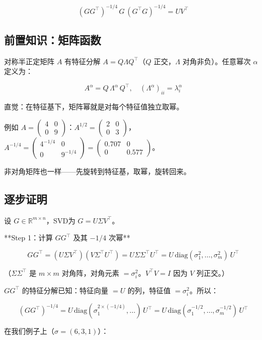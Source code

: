 \documentclass[12pt,a4paper]{article}
\begin{document}
\[(GG^\top)^{-1/4}\,G\,(G^\top G)^{-1/4} = UV^\top\]


\subsection{前置知识：矩阵函数}

对称半正定矩阵 $A$ 有特征分解 $A = Q\Lambda Q^\top$（$Q$ 正交，$\Lambda$ 对角非负）。任意幂次 $\alpha$ 定义为：


\[A^\alpha = Q\,\Lambda^\alpha\,Q^\top, \quad (\Lambda^\alpha)_{ii} = \lambda_i^\alpha\]

直觉：在特征基下，矩阵幂就是对每个特征值独立取幂。

例如 $A = \begin{pmatrix}4&0\\0&9\end{pmatrix}$：$A^{1/2} = \begin{pmatrix}2&0\\0&3\end{pmatrix}$，$A^{-1/4} = \begin{pmatrix}4^{-1/4}&0\\0&9^{-1/4}\end{pmatrix} = \begin{pmatrix}0.707&0\\0&0.577\end{pmatrix}$。

非对角矩阵也一样——先旋转到特征基，取幂，旋转回来。


\subsection{逐步证明}

设 $G \in \mathbb{R}^{m \times n}$，SVD为 $G = U\Sigma V^\top$。

**Step 1：计算 $GG^\top$ 及其 $-1/4$ 次幂**


\[GG^\top = (U\Sigma V^\top)(V\Sigma^\top U^\top) = U\Sigma\Sigma^\top U^\top = U\,\text{diag}(\sigma_1^2, \ldots, \sigma_m^2)\,U^\top\]

（$\Sigma\Sigma^\top$ 是 $m \times m$ 对角阵，对角元素 $= \sigma_i^2$。$V^\top V = I$ 因为 $V$ 列正交。）

$GG^\top$ 的特征分解已知：特征向量 $= U$ 的列，特征值 $= \sigma_i^2$。所以：


\[(GG^\top)^{-1/4} = U\,\text{diag}(\sigma_1^{2 \times (-1/4)}, \ldots)\,U^\top = U\,\text{diag}(\sigma_1^{-1/2}, \ldots, \sigma_m^{-1/2})\,U^\top\]

在我们例子上（$\sigma = (6, 3, 1)$）：
\end{document}
